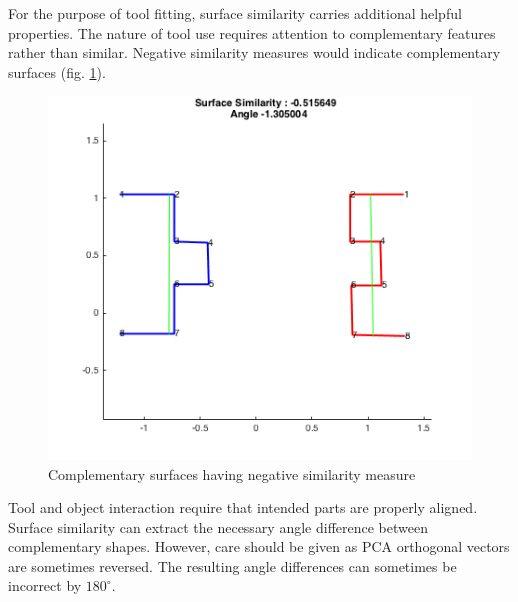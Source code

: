 \documentclass[
    floatsintext
]{article}
\begin{document}
For the purpose of tool fitting, surface similarity carries additional helpful properties. 
The nature of tool use requires attention to complementary features rather than similar. 
Negative similarity measures would indicate complementary surfaces (fig. \ref{fig:complementary}). 

\begin{figure}[h]
  \centering
  \includegraphics[width=.7\textwidth]{./figures/complementary.png}
  \caption{Complementary surfaces having negative similarity measure}
  \label{fig:complementary}
\end{figure}  

Tool and object interaction require that intended parts are properly aligned.
Surface similarity can extract the necessary angle difference between complementary shapes.
However, care should be given as PCA orthogonal vectors are sometimes reversed. 
The resulting angle differences can sometimes be incorrect by $180^{\circ}$. 



\end{document}
